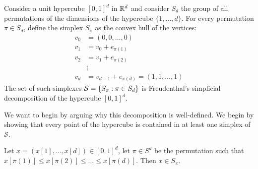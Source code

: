 \begin{definition}
    Consider a unit hypercube $[0, 1]^d$ in $\mathbb{R}^d$ and consider $S_d$ the group of all permutations of the dimensions of the hypercube $\{1, \dots, d\}$. For every permutation $\pi \in S_d$, define the simplex $S_{\pi}$ as the convex hull of the vertices:
    \begin{align*}
        v_0 & = (0, 0, \dots, 0)                        \\
        v_1 & = v_0 + e_{\pi(1)}                        \\
        v_2 & = v_1 + e_{\pi(2)}                        \\
            & \vdots                                    \\
        v_d & = v_{d-1} + e_{\pi(d)} = (1, 1, \dots, 1)
    \end{align*}
    The set of such simplexes $\mathcal{S} = \left\{S_{\pi} : \pi \in S_d\right\}$ is Freudenthal's simplicial decomposition of the hypercube $[0, 1]^d$.
\end{definition}
We want to begin by arguing why this decomposition is well-defined. We begin by showing that every point of the hypercube is contained in at least one simplex of $\mathcal{S}$.
\begin{lemma}
    \label{lem:caracterisation_of_simplices}
    Let $x = (x[1], \dots, x[d]) \in [0, 1]^d$, let $\pi \in S^d$ be the permutation such that $x[\pi(1)] \leq x[\pi(2)] \leq \dots \leq x[\pi(d)]$. Then $x \in S_{\pi}$.
\end{lemma}
